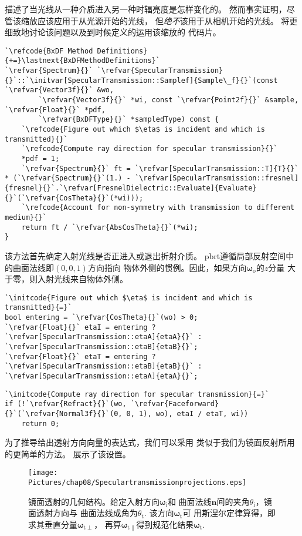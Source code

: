 描述了当光线从一种介质进入另一种时辐亮度是怎样变化的。
然而事实证明，尽管该缩放应该应用于从光源开始的光线，
但\emph{绝不}该用于从相机开始的光线。
将更细致地讨论该问题以及到时候定义的运用该缩放的
代码片{}。
\begin{lstlisting}
`\refcode{BxDF Method Definitions}{+=}\lastnext{BxDFMethodDefinitions}`
`\refvar{Spectrum}{}` `\refvar{SpecularTransmission}{}`::`\initvar[SpecularTransmission::Samplef]{Sample\_f}{}`(const `\refvar{Vector3f}{}` &wo,
        `\refvar{Vector3f}{}` *wi, const `\refvar{Point2f}{}` &sample, `\refvar{Float}{}` *pdf,
        `\refvar{BxDFType}{}` *sampledType) const {
    `\refcode{Figure out which $\eta$ is incident and which is transmitted}{}`
    `\refcode{Compute ray direction for specular transmission}{}`
    *pdf = 1;
    `\refvar{Spectrum}{}` ft = `\refvar[SpecularTransmission::T]{T}{}` * (`\refvar{Spectrum}{}`(1.) - `\refvar[SpecularTransmission::fresnel]{fresnel}{}`.`\refvar[FresnelDielectric::Evaluate]{Evaluate}{}`(`\refvar{CosTheta}{}`(*wi)));
    `\refcode{Account for non-symmetry with transmission to different medium}{}`
    return ft / `\refvar{AbsCosTheta}{}`(*wi);
}
\end{lstlisting}

该方法首先确定入射光线是否正进入或退出折射介质。
pbrt遵循局部反射空间中的曲面法线即$(0,0,1)$方向指向
物体外侧的惯例。因此，如果方向${\bm\omega_{\mathrm{o}}}$的$z$分量
大于零，则入射光线来自物体外侧。
\begin{lstlisting}
`\initcode{Figure out which $\eta$ is incident and which is transmitted}{=}`
bool entering = `\refvar{CosTheta}{}`(wo) > 0;
`\refvar{Float}{}` etaI = entering ? `\refvar[SpecularTransmission::etaA]{etaA}{}` : `\refvar[SpecularTransmission::etaB]{etaB}{}`;
`\refvar{Float}{}` etaT = entering ? `\refvar[SpecularTransmission::etaB]{etaB}{}` : `\refvar[SpecularTransmission::etaA]{etaA}{}`;
\end{lstlisting}
\begin{lstlisting}
`\initcode{Compute ray direction for specular transmission}{=}`
if (!`\refvar{Refract}{}`(wo, `\refvar{Faceforward}{}`(`\refvar{Normal3f}{}`(0, 0, 1), wo), etaI / etaT, wi))
    return 0;
\end{lstlisting}

为了推导给出透射方向向量的表达式，我们可以采用
类似于我们为镜面反射所用的更简单的方法。
展示了该设置。

\begin{figure}[htbp]
    \centering
    \texttt{[image: Pictures/chap08/Speculartransmissionprojections.eps]}
    \caption{镜面透射的几何结构。给定入射方向${\bm\omega}_{\mathrm{i}}$和
        曲面法线$\bm n$间的夹角$\theta_{\mathrm{i}}$，镜面透射方向与
        曲面法线成角为$\theta_{\mathrm{t}}$. 该方向${\bm\omega}_{\mathrm{t}}$可
        用斯涅尔定律算得，即求其垂直分量${\bm\omega}_{\mathrm{t}\perp}$，
        再算${\bm\omega}_{\mathrm{t}\parallel}$得到规范化结果${\bm\omega}_{\mathrm{t}}$.}
    \label{fig:8.11}
\end{figure}

